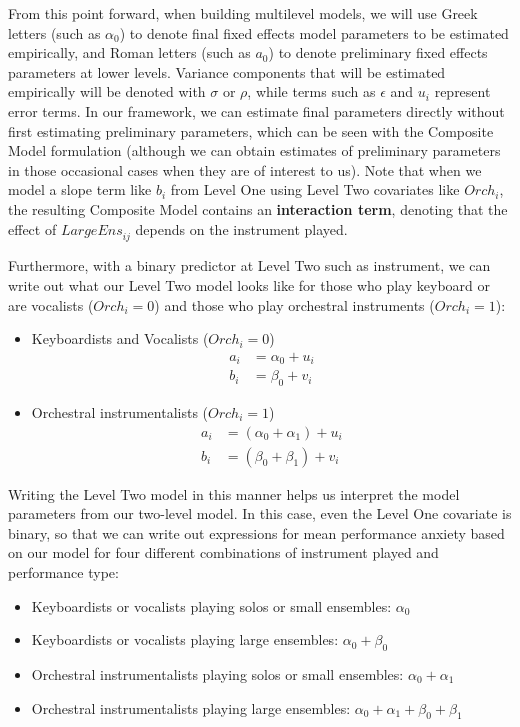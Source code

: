 \documentclass[
]{krantz}
\providecommand{\tightlist}{%
  \setlength{\itemsep}{0pt}\setlength{\parskip}{0pt}}
\begin{document}
From this point forward, when building multilevel models, we will use Greek letters (such as \(\alpha_{0}\)) to denote final fixed effects model parameters to be estimated empirically, and Roman letters (such as \(a_{0}\)) to denote preliminary fixed effects parameters at lower levels. Variance components that will be estimated empirically will be denoted with \(\sigma\) or \(\rho\), while terms such as \(\epsilon\) and \(u_{i}\) represent error terms. In our framework, we can estimate final parameters directly without first estimating preliminary parameters, which can be seen with the Composite Model formulation (although we can obtain estimates of preliminary parameters in those occasional cases when they are of interest to us). Note that when we model a slope term like \(b_{i}\) from Level One using Level Two covariates like \(\textstyle{Orch}_{i}\), the resulting Composite Model contains an \textbf{interaction term}, denoting that the effect of \(\textstyle{LargeEns}_{ij}\) depends on the instrument played.

Furthermore, with a binary predictor at Level Two such as instrument, we can write out what our Level Two model looks like for those who play keyboard or are vocalists (\(\textstyle{Orch}_{i}=0\)) and those who play orchestral instruments (\(\textstyle{Orch}_{i}=1\)):

\begin{itemize}
\tightlist
\item
  Keyboardists and Vocalists (\(\textstyle{Orch}_{i}=0\))
  \begin{align*}
  a_{i} & = \alpha_{0}+u_{i} \\
  b_{i} & = \beta_{0}+v_{i}
  \end{align*}
\item
  Orchestral instrumentalists (\(\textstyle{Orch}_{i}=1\))
  \begin{align*}
  a_{i} & = (\alpha_{0}+\alpha_{1})+u_{i} \\
  b_{i} & = (\beta_{0}+\beta_{1})+v_{i}
  \label{eq:level2byorch}
  \end{align*}
\end{itemize}

Writing the Level Two model in this manner helps us interpret the model parameters from our two-level model. In this case, even the Level One covariate is binary, so that we can write out expressions for mean performance anxiety based on our model for four different combinations of instrument played and performance type:

\begin{itemize}
\tightlist
\item
  Keyboardists or vocalists playing solos or small ensembles: \(\alpha_{0}\)
\item
  Keyboardists or vocalists playing large ensembles: \(\alpha_{0}+\beta_{0}\)
\item
  Orchestral instrumentalists playing solos or small ensembles: \(\alpha_{0}+\alpha_{1}\)
\item
  Orchestral instrumentalists playing large ensembles: \(\alpha_{0}+\alpha_{1}+\beta_{0}+\beta_{1}\)
\end{itemize}
\end{document}
